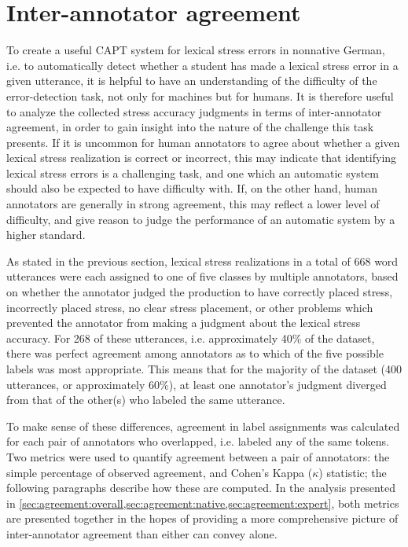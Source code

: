 	
	\section{Inter-annotator agreement}
	\label{sec:lexstress:agreement}	
	
	To create a useful CAPT system for lexical stress errors in nonnative German, i.e. to automatically detect whether a student has made a lexical stress error in a given utterance, it is helpful to have an understanding of the difficulty of the error-detection task, not only for machines but for humans. It is therefore useful to analyze the collected stress accuracy judgments in terms of inter-annotator agreement, in order to gain insight into the nature of the challenge this task presents. If it is uncommon for human annotators to agree about whether a given lexical stress realization is correct or incorrect, this may indicate that  identifying lexical stress errors is a challenging task, and one which an automatic system should also be expected to have difficulty with. If, on the other hand, human annotators are generally in strong agreement, this may reflect a lower level of difficulty, and give reason to judge the performance of an automatic system by a higher standard.  
	
	As stated in the previous section,
	lexical stress realizations in a total of 
	668 word utterances were each assigned to one of five classes by multiple annotators, based on whether the annotator judged the production to have correctly placed stress, incorrectly placed stress, no clear stress placement, or other problems which prevented the annotator from making a judgment about the lexical stress accuracy. 
	For 268 of these utterances, i.e. approximately 40\% of the dataset, there was perfect agreement among annotators as to which of the five possible labels was most appropriate. This means that for the majority of the dataset (400 utterances, or approximately 60\%), at least one annotator's judgment diverged from that of the other(s) who labeled the same utterance.
	
	
	To make sense of these differences,  
	agreement in label assignments was calculated for each pair of annotators who overlapped, i.e. labeled any of the same tokens. 
		Two metrics were used to quantify agreement between a pair of annotators: the simple percentage of observed agreement, and Cohen's Kappa ($\kappa$) statistic; the following paragraphs describe how these are computed. In the analysis presented in \cref{sec:agreement:overall,sec:agreement:native,sec:agreement:expert}, both metrics are presented together in the hopes of providing a more comprehensive picture of inter-annotator agreement than either can convey alone.  
		
